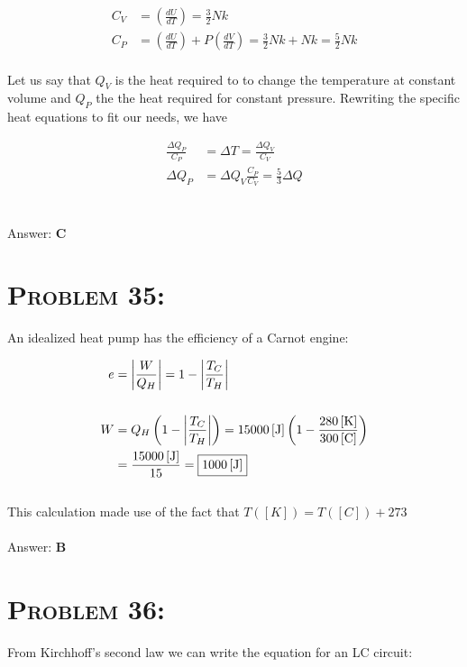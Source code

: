 \documentclass{article}
\begin{document}
\begin{align}
C_{V} &= \left(\frac{d U}{d T}\right) = \frac{3}{2}Nk\nonumber\\
C_{P} &= \left(\frac{d U}{d T}\right) + P\left(\frac{d V}{d T}\right) =  \frac{3}{2}Nk + Nk = \frac{5}{2}Nk\nonumber
\end{align}
\\
Let us say that $Q_{V}$ is the heat required to to change the temperature at constant volume and $Q_{P}$ the the heat required for constant pressure. Rewriting the specific heat equations to fit our needs, we have

\begin{align}
\frac{\Delta Q_{P}}{C_{P}} &= \Delta T = \frac{\Delta Q_{V}}{C_{V}}\nonumber\\
\Delta Q_{P} &= \Delta Q_{V}\frac{C_{P}}{C_{V}} = \boxed{\frac{5}{3} \Delta Q}
\end{align}
\\\\
Answer: \textbf{\textcolor{ProcessBlue}C}\\


\section{\textsc{Problem 35:}} An idealized heat pump has the efficiency of a Carnot engine:

\begin{align}
e &= \left| \frac{W}{Q_{H}}\right| = 1- \left|\frac{T_{C}}{T_{H}}\right|\\
\nonumber \\
W &= Q_{H} \left(1- \left|\frac{T_{C}}{T_{H}}\right|\right)= \unit[15000]{[J]} \left(1- \frac{\unit[280]{[K]}}{\unit[300]{[C]}}\right)\nonumber \\
 &= \frac{\unit[15000]{[J]}}{15} = \boxed{\unit[1000]{[J]}}\nonumber
\end{align}
\\
This calculation made use of the fact that $T([K]) = T([C]) + 273$
\\\\
Answer: \textbf{\textcolor{ProcessBlue}B}\\


\section{\textsc{Problem 36:}} From Kirchhoff's second law we can write the equation for an LC circuit:
\end{document}
